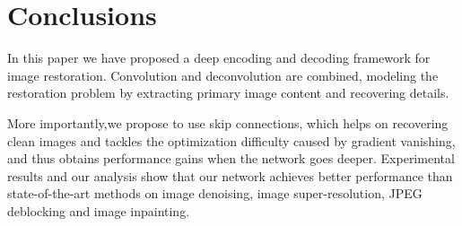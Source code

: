 \section{Conclusions}

In this paper we have proposed a deep encoding and decoding framework
for image restoration. Convolution and deconvolution are combined,
modeling the restoration problem by extracting primary image content and recovering details.

More importantly,we propose to use skip connections, which helps on recovering
clean images and tackles the optimization difficulty caused by gradient
vanishing, and thus obtains performance gains when the network goes deeper.
Experimental results and our analysis show that our network achieves better
performance than state-of-the-art methods on image denoising,
image super-resolution, JPEG deblocking and image inpainting.
